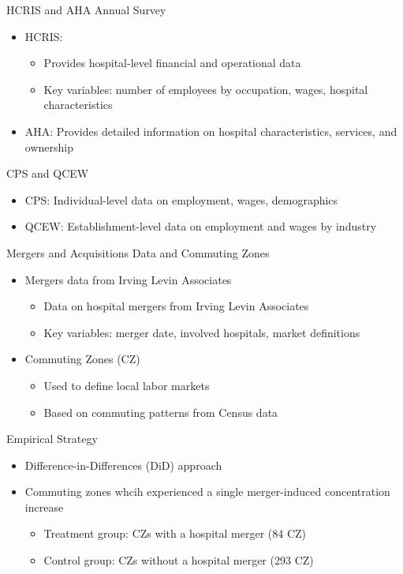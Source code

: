 \documentclass{beamer}
\begin{document}
\begin{frame}{HCRIS and AHA Annual Survey}
  \begin{itemize}
    \item HCRIS:
    \begin{itemize}
      \item Provides hospital-level financial and operational data
      \item Key variables: number of employees by occupation, wages, hospital characteristics
    \end{itemize}
    \item AHA: Provides detailed information on hospital characteristics, services, and ownership
  \end{itemize}
\end{frame}

\begin{frame}{CPS and QCEW}
  \begin{itemize}
    \item CPS: Individual-level data on employment, wages, demographics
    \item QCEW: Establishment-level data on employment and wages by industry
  \end{itemize}
\end{frame}

\begin{frame}{Mergers and Acquisitions Data and Commuting Zones}
  \begin{itemize}
    \item Mergers data from Irving Levin Associates
    \begin{itemize}
      \item Data on hospital mergers from Irving Levin Associates
      \item Key variables: merger date, involved hospitals, market definitions
    \end{itemize}
    \item Commuting Zones (CZ)
    \begin{itemize}
      \item Used to define local labor markets
      \item Based on commuting patterns from Census data
    \end{itemize}
  \end{itemize}
\end{frame}

\begin{frame}{Empirical Strategy}
  \begin{itemize}
    \item Difference-in-Differences (DiD) approach
    \item Commuting zones whcih experienced a single merger-induced concentration increase
    \begin{itemize}
      \item Treatment group: CZs with a hospital merger (84 CZ)
      \item Control group: CZs without a hospital merger (293 CZ)
    \end{itemize}
  \end{itemize}
\end{frame}
\end{document}
